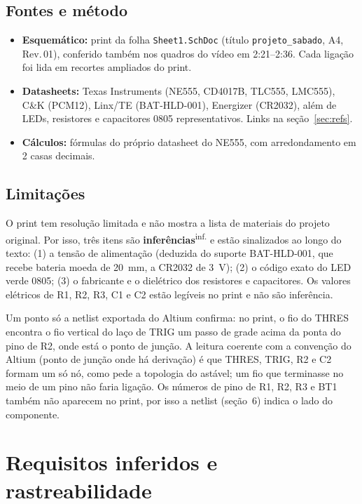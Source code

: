 \documentclass[11pt,a4paper]{article}
\newcommand{\inferido}{\textsuperscript{\textcolor{douradoEsc}{\sffamily inf.}}}
\begin{document}
\subsection{Fontes e método}
\begin{itemize}
  \item \textbf{Esquemático:} print da folha \texttt{Sheet1.SchDoc} (título
  \texttt{projeto\_sabado}, A4, Rev.\,01), conferido também nos quadros do vídeo em
  2:21–2:36. Cada ligação foi lida em recortes ampliados do print.
  \item \textbf{Datasheets:} Texas Instruments (NE555, CD4017B, TLC555, LMC555), C\&K
  (PCM12), Linx/TE (BAT-HLD-001), Energizer (CR2032), além de LEDs, resistores e
  capacitores 0805 representativos. Links na seção~\ref{sec:refs}.
  \item \textbf{Cálculos:} fórmulas do próprio datasheet do NE555, com arredondamento
  em 2 casas decimais.
\end{itemize}

\subsection{Limitações}
O print tem resolução limitada e não mostra a lista de materiais do projeto original.
Por isso, três itens são \textbf{inferências}\inferido{} e estão sinalizados ao longo do texto:
(1) a tensão de alimentação (deduzida do suporte BAT-HLD-001, que recebe bateria moeda
de \SI{20}{\milli\meter}, a CR2032 de \SI{3}{\volt}); (2) o código exato do LED verde
0805; (3) o fabricante e o dielétrico dos resistores e capacitores. Os valores elétricos de
R1, R2, R3, C1 e C2 estão legíveis no print e não são inferência.

Um ponto só a netlist exportada do Altium confirma: no print, o fio do THRES encontra o fio
vertical do laço de TRIG um passo de grade acima da ponta do pino de R2, onde está o ponto de
junção. A leitura coerente com a convenção do Altium (ponto de junção onde há derivação) é
que THRES, TRIG, R2 e C2 formam um só nó, como pede a topologia do astável; um fio que
terminasse no meio de um pino não faria ligação. Os números de pino de R1, R2, R3 e BT1
também não aparecem no print, por isso a netlist (seção~6) indica o lado do componente.

\section{Requisitos inferidos e rastreabilidade}
\end{document}

